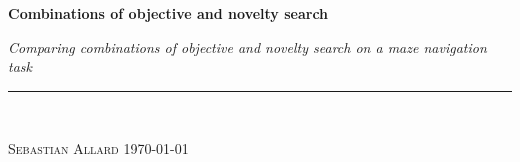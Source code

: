 
\vspace*{5cm}

\begin{flushleft}
\Huge \textsf{\textbf{Combinations of objective and novelty search}}
\end{flushleft}

\emph{\large Comparing combinations of objective and novelty search on a maze navigation task} \hfill \\
\rule{\textwidth}{1pt} \\

\begin{flushright}
\textsc{Sebastian Allard} \quad \today
\end{flushright}


\thispagestyle{empty}
